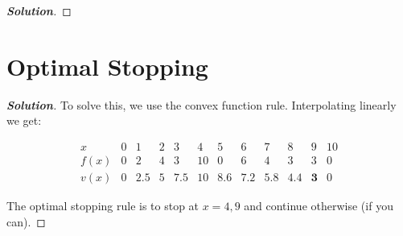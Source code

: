 \documentclass[12pt]{book}
\newenvironment{problem}[2][Problem]{\begin{trivlist}
\item[\hskip \labelsep {\bfseries #1}\hskip \labelsep {\bfseries #2.}]}{\end{trivlist}}
\newenvironment{solution}
               {\let\oldqedsymbol=\qedsymbol
                \renewcommand{\qedsymbol}{$\square$}
                \begin{proof}[\bfseries\upshape Solution]}
               {\end{proof}
                \renewcommand{\qedsymbol}{\oldqedsymbol}}
\begin{document}
\begin{problem}{3.1}
\end{problem}
\begin{solution}
\end{solution}




\chapter{Optimal Stopping}

\begin{problem}{4.1}
\end{problem}
\begin{solution}

To solve this, we use the convex function rule. Interpolating linearly we get:

\[
\begin{array}{c|ccccccccccc}
x & 0 & 1 & 2 & 3 & 4 & 5 & 6 & 7 & 8 & 9 & 10 \\
\hline
f(x) & 0 & 2 & 4 & 3 & 10 & 0 & 6 & 4 & 3 & 3 & 0 \\
v(x) & 0 & 2.5 & 5 & 7.5 & 10 & 8.6 & 7.2 & 5.8 & 4.4 & \mathbf{3} & 0
\end{array}
\]

The optimal stopping rule is to stop at \( x = 4, 9 \) and continue otherwise (if you can).
\end{solution}
\end{document}
